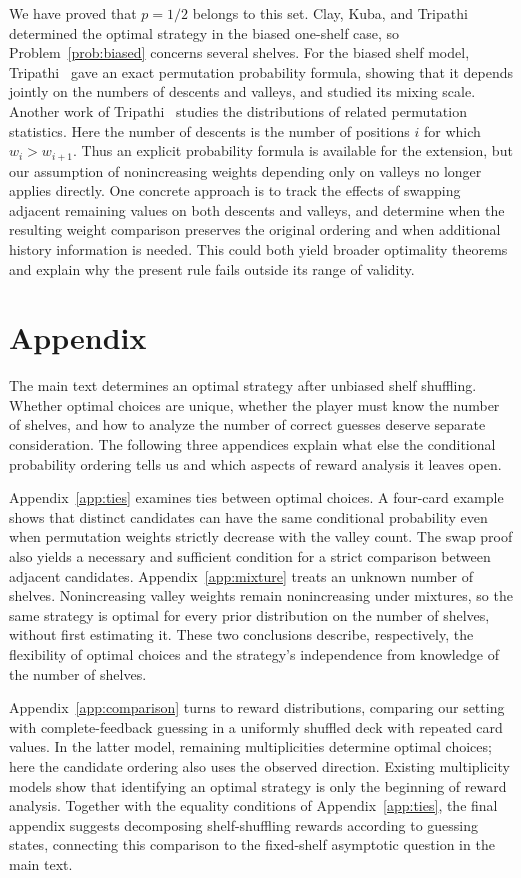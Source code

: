 \documentclass[11pt,reqno]{amsart}
\numberwithin{equation}{section}
\theoremstyle{definition}
\theoremstyle{remark}
\begin{document}
We have proved that $p=1/2$ belongs to this set. Clay, Kuba, and Tripathi~\cite{CKT} determined the optimal strategy in the biased one-shelf case, so Problem~\ref{prob:biased} concerns several shelves. For the biased shelf model, Tripathi~\cite{TripathiLaw} gave an exact permutation probability formula, showing that it depends jointly on the numbers of descents and valleys, and studied its mixing scale. Another work of Tripathi~\cite{TripathiStats} studies the distributions of related permutation statistics. Here the number of descents is the number of positions $i$ for which $w_i>w_{i+1}$. Thus an explicit probability formula is available for the extension, but our assumption of nonincreasing weights depending only on valleys no longer applies directly. One concrete approach is to track the effects of swapping adjacent remaining values on both descents and valleys, and determine when the resulting weight comparison preserves the original ordering and when additional history information is needed. This could both yield broader optimality theorems and explain why the present rule fails outside its range of validity.
\clearpage
\appendix
\section*{Appendix}
The main text determines an optimal strategy after unbiased shelf shuffling. Whether optimal choices are unique, whether the player must know the number of shelves, and how to analyze the number of correct guesses deserve separate consideration. The following three appendices explain what else the conditional probability ordering tells us and which aspects of reward analysis it leaves open.

Appendix~\ref{app:ties} examines ties between optimal choices. A four-card example shows that distinct candidates can have the same conditional probability even when permutation weights strictly decrease with the valley count. The swap proof also yields a necessary and sufficient condition for a strict comparison between adjacent candidates. Appendix~\ref{app:mixture} treats an unknown number of shelves. Nonincreasing valley weights remain nonincreasing under mixtures, so the same strategy is optimal for every prior distribution on the number of shelves, without first estimating it. These two conclusions describe, respectively, the flexibility of optimal choices and the strategy's independence from knowledge of the number of shelves.

Appendix~\ref{app:comparison} turns to reward distributions, comparing our setting with complete-feedback guessing in a uniformly shuffled deck with repeated card values. In the latter model, remaining multiplicities determine optimal choices; here the candidate ordering also uses the observed direction. Existing multiplicity models show that identifying an optimal strategy is only the beginning of reward analysis. Together with the equality conditions of Appendix~\ref{app:ties}, the final appendix suggests decomposing shelf-shuffling rewards according to guessing states, connecting this comparison to the fixed-shelf asymptotic question in the main text.
\end{document}
